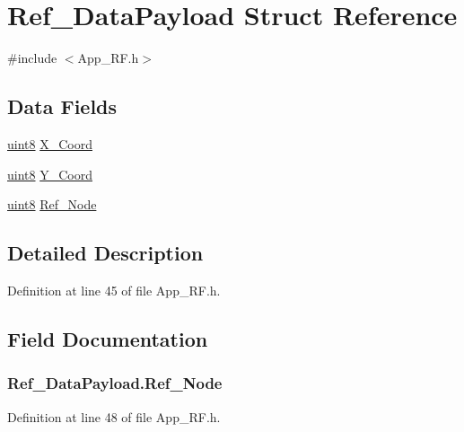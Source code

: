 \hypertarget{struct_ref___data_payload}{
\section{Ref\_\-DataPayload Struct Reference}
\label{struct_ref___data_payload}
}


{\ttfamily \#include $<$App\_\-RF.h$>$}

\subsection*{Data Fields}
\begin{DoxyCompactItemize}
\item 
\hyperlink{hal__types_8h_adde6aaee8457bee49c2a92621fe22b79}{uint8} \hyperlink{struct_ref___data_payload_a7fea4ab55431b1757755c5200fc1c3e0}{X\_\-Coord}
\item 
\hyperlink{hal__types_8h_adde6aaee8457bee49c2a92621fe22b79}{uint8} \hyperlink{struct_ref___data_payload_afa8ec9f1d908ed58d0d0409219cc4f53}{Y\_\-Coord}
\item 
\hyperlink{hal__types_8h_adde6aaee8457bee49c2a92621fe22b79}{uint8} \hyperlink{struct_ref___data_payload_a136d31fe1884be118901f3a250ad2b26}{Ref\_\-Node}
\end{DoxyCompactItemize}


\subsection{Detailed Description}


Definition at line 45 of file App\_\-RF.h.



\subsection{Field Documentation}
\hypertarget{struct_ref___data_payload_a136d31fe1884be118901f3a250ad2b26}{
\subsubsection[{Ref\_\-Node}]{ {\bf Ref\_\-DataPayload.Ref\_\-Node}}}
\label{struct_ref___data_payload_a136d31fe1884be118901f3a250ad2b26}


Definition at line 48 of file App\_\-RF.h.

